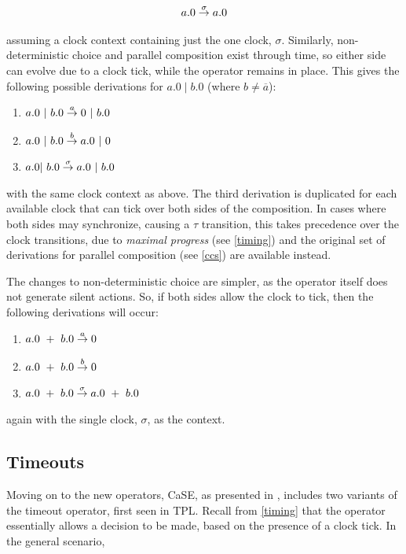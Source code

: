 \begin{equation}
a.0 \stackrel{\sigma}{\rightarrow} a.0
\end{equation}

\noindent assuming a clock context containing just the one clock,
$\sigma$. Similarly, non-deterministic choice and parallel composition
exist through time, so either side can evolve due to a clock tick,
while the operator remains in place.  This gives the following
possible derivations for $a.0\;|\;b.0$ (where $b \ne \overline{a}$):

\begin{enumerate}
\item $a.0\ |\ b.0 \derives{a} 0\ |\ b.0$
\item $a.0\ |\ b.0 \derives{b} a.0\ |\ 0$
\item $a.0 |\ b.0 \derives{\sigma} a.0\ |\ b.0$
\end{enumerate}

\noindent with the same clock context as above.  The third derivation
is duplicated for each available clock that can tick over both sides
of the composition.  In cases where both sides may synchronize,
causing a $\tau$ transition, this takes precedence over the clock
transitions, due to \emph{maximal progress} (see \ref{timing}) and the
original set of derivations for parallel composition (see \ref{ccs})
are available instead.

The changes to non-deterministic choice are simpler, as the operator itself
does not generate silent actions.  So, if both sides allow the clock to tick,
then the following derivations will occur:

\begin{enumerate}
\item $a.0\ +\ b.0 \stackrel{a}{\rightarrow} 0$
\item $a.0\ +\ b.0 \stackrel{b}{\rightarrow} 0$
\item $a.0\ +\ b.0 \derives{\sigma} a.0\ +\ b.0$
\end{enumerate}

\noindent again with the single clock, $\sigma$, as the context.

\subsection{Timeouts}

Moving on to the new operators, CaSE, as presented in
\cite{norton05alg}, includes two variants of the timeout operator,
first seen in TPL.  Recall from \ref{timing} that the operator
essentially allows a decision to be made, based on the presence of a
clock tick.  In the general scenario,

